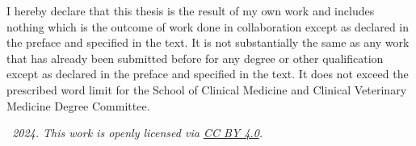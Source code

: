 
\begin{declaration}

    I hereby declare that this thesis is the result of my own work and includes nothing which is the outcome of work done in collaboration except as declared in the preface and specified in the text. It is not substantially the same as any work that has already been submitted before for any degree or other qualification except as declared in the preface and specified in the text. It does not exceed the prescribed word limit for the School of Clinical Medicine and Clinical Veterinary Medicine Degree Committee.

\end{declaration}


\begin{flushright}
    \textit{\textcopyright~2024. This work is openly licensed via \href{https://creativecommons.org/licenses/by/4.0/}{CC BY 4.0}.}
\end{flushright}